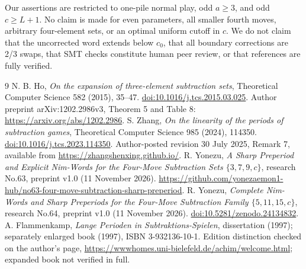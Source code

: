 \documentclass[10pt,a4paper]{article}
\begin{document}
Our assertions are restricted to one-pile normal play, odd $a\ge3$, and odd $c\ge L+1$. No claim is made for even parameters, all smaller fourth moves, arbitrary four-element sets, or an optimal uniform cutoff in $c$. We do not claim that the uncorrected word extends below $c_0$, that all boundary corrections are 2/3 swaps, that SMT checks constitute human peer review, or that references are fully verified.

\begingroup\small
\begin{thebibliography}{9}
 N. B. Ho, \emph{On the expansion of three-element subtraction sets}, Theoretical Computer Science 582 (2015), 35--47. \href{https://doi.org/10.1016/j.tcs.2015.03.025}{doi:10.1016/j.tcs.2015.03.025}. Author preprint arXiv:1202.2986v3, Theorem 5 and Table 8: \url{https://arxiv.org/abs/1202.2986}.
 S. Zhang, \emph{On the linearity of the periods of subtraction games}, Theoretical Computer Science 985 (2024), 114350. \href{https://doi.org/10.1016/j.tcs.2023.114350}{doi:10.1016/j.tcs.2023.114350}. Author-posted revision 30 July 2025, Remark 7, available from \url{https://zhangshenxing.github.io/}.
 R. Yonezu, \emph{A Sharp Preperiod and Explicit Nim-Words for the Four-Move Subtraction Sets $\{3,7,9,c\}$}, research No.63, preprint v1.0 (11 November 2026). \url{https://github.com/yonezaemon1-hub/no63-four-move-subtraction-sharp-preperiod}.
 R. Yonezu, \emph{Complete Nim-Words and Sharp Preperiods for the Four-Move Subtraction Family $\{5,11,15,c\}$}, research No.64, preprint v1.0 (11 November 2026). \href{https://doi.org/10.5281/zenodo.24134832}{doi:10.5281/zenodo.24134832}.
 A. Flammenkamp, \emph{Lange Perioden in Subtraktions-Spielen}, dissertation (1997); separately enlarged book (1997), ISBN 3-932136-10-1. Edition distinction checked on the author's page, \url{https://wwwhomes.uni-bielefeld.de/achim/welcome.html}; expanded book not verified in full.
\end{thebibliography}
\endgroup
\end{document}
